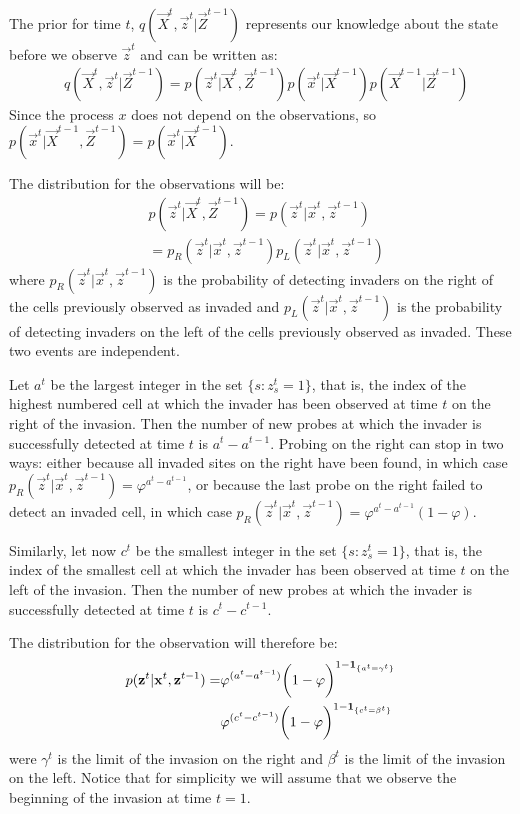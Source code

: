 The prior for time $t$, $q(\vec{X}^{t}, \vec{z}^t | \vec{Z}^{t-1})$ represents our knowledge about the state before we observe $\vec{z}^{t}$ and can be written as:
\begin{align}
    & q(\vec{X}^{t}, \vec{z}^{t} | \vec{Z}^{t-1}) = p(\vec{z}^{t} | \vec{X}^{t}, \vec{Z}^{t-1}) p(\vec{x}^{t} | \vec{X}^{t-1}) p(\vec{X}^{t-1} | \vec{Z}^{t-1}) \label{eq:3}
\end{align}
Since the process $x$ does not depend on the observations, so $p(\vec{x}^{t} | \vec{X}^{t-1}, \vec{Z}^{t-1}) = p(\vec{x}^{t} | \vec{X}^{t-1})$.

The distribution for the observations will be:
\begin{align*}
    & p(\vec{z}^{t} | \vec{X}^{t}, \vec{Z}^{t-1}) = p(\vec{z}^{t} | \vec{x}^{t}, \vec{z}^{t-1}) \\
    & = p_R(\vec{z}^{t} | \vec{x}^{t}, \vec{z}^{t-1}) p_L(\vec{z}^{t} | \vec{x}^{t}, \vec{z}^{t-1})
\end{align*}
where $p_R(\vec{z}^{t} | \vec{x}^{t}, \vec{z}^{t-1})$ is the probability of detecting invaders on the right of the cells previously observed as invaded and $p_L(\vec{z}^{t} | \vec{x}^{t}, \vec{z}^{t-1})$ is the probability of detecting invaders on the left of the cells previously observed as invaded. These two events are independent.

Let $a^{t}$ be the largest integer in the set $\{ s : z_s^{t} = 1 \}$, that is, the index of the highest numbered cell at which the invader has been observed at time $t$ on the right of the invasion. Then the number of new probes at which the invader is successfully detected at time $t$ is $a^{t} - a^{t-1}$. Probing on the right can stop in two ways: either because all invaded sites on the right have been found, in which case $p_R(\vec{z}^{t} | \vec{x}^{t}, \vec{z}^{t-1}) = \varphi^{a^{t} - a^{t-1}}$, or because the last probe on the right failed to detect an invaded cell, in which case $p_R(\vec{z}^{t} | \vec{x}^{t}, \vec{z}^{t-1}) = \varphi^{a^{t} - a^{t-1}} (1 - \varphi)$.

Similarly, let now $c^{t}$ be the smallest integer in the set $\{ s : z_s^{t} = 1 \}$, that is, the index of the smallest cell at which the invader has been observed at time $t$ on the left of the invasion. Then the number of new probes at which the invader is successfully detected at time $t$ is $c^{t} - c^{t-1}$.

The distribution for the observation will therefore be:
\begin{align*}
    p(\mathbf{z}^{t} | \mathbf{x}^{t}, \mathbf{z}^{t-1}) = &\varphi^{(a^{t} - a^{t-1})} \bigg(1 - \varphi \bigg)^{1-\mathbf{1}_{\{a^{t}=\gamma^{t}\}}}\\
    &\varphi^{(c^{t} - c^{t-1})} \bigg( 1 - \varphi \bigg)^{1-\mathbf{1}_{\{c^{t}=\beta^{t}\}}}
\end{align*}
were $\gamma^{t}$ is the limit of the invasion on the right and $\beta^{t}$ is the limit of the invasion on the left. Notice that for simplicity we will assume that we observe the beginning of the invasion at time $t=1$. 


